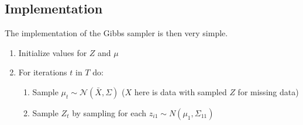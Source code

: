 \documentclass[12pt]{article}
\begin{document}
    \subsection{Implementation}
    The implementation of the Gibbs sampler is then very simple. 
    \begin{enumerate}
        \item Initialize values for $Z$ and $\mu$
        \item For iterations $t$ in $T$ do:
        \begin{enumerate}[label*={\arabic*.}]
            \item Sample $\mu_t \sim \mathcal{N}(\bar{X}, \Sigma)$ ($X$ here is data with sampled $Z$ for missing data) 
            \item Sample $Z_t$ by sampling for each $z_{i1} \sim N(\mu_1, \Sigma_{11})$
        \end{enumerate}
    \end{enumerate}


\appendix

% 


    
\end{document}
